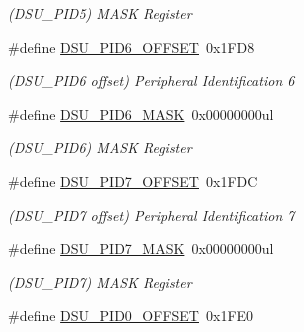 \begin{DoxyCompactItemize}
\begin{DoxyCompactList}\small\item\em (D\+S\+U\+\_\+\+P\+I\+D5) M\+A\+S\+K Register \end{DoxyCompactList}\item 
\hypertarget{group___s_a_m_l21___d_s_u_gaef7906d7c83735893dad365a6292f4c2}{}\#define \hyperlink{group___s_a_m_l21___d_s_u_gaef7906d7c83735893dad365a6292f4c2}{D\+S\+U\+\_\+\+P\+I\+D6\+\_\+\+O\+F\+F\+S\+E\+T}~0x1\+F\+D8\label{group___s_a_m_l21___d_s_u_gaef7906d7c83735893dad365a6292f4c2}

\begin{DoxyCompactList}\small\item\em (D\+S\+U\+\_\+\+P\+I\+D6 offset) Peripheral Identification 6 \end{DoxyCompactList}\item 
\hypertarget{group___s_a_m_l21___d_s_u_gac1a214954faa7cfd1597c2f5dc50b61e}{}\#define \hyperlink{group___s_a_m_l21___d_s_u_gac1a214954faa7cfd1597c2f5dc50b61e}{D\+S\+U\+\_\+\+P\+I\+D6\+\_\+\+M\+A\+S\+K}~0x00000000ul\label{group___s_a_m_l21___d_s_u_gac1a214954faa7cfd1597c2f5dc50b61e}

\begin{DoxyCompactList}\small\item\em (D\+S\+U\+\_\+\+P\+I\+D6) M\+A\+S\+K Register \end{DoxyCompactList}\item 
\hypertarget{group___s_a_m_l21___d_s_u_ga177551481d873cd49c5348a580bb583d}{}\#define \hyperlink{group___s_a_m_l21___d_s_u_ga177551481d873cd49c5348a580bb583d}{D\+S\+U\+\_\+\+P\+I\+D7\+\_\+\+O\+F\+F\+S\+E\+T}~0x1\+F\+D\+C\label{group___s_a_m_l21___d_s_u_ga177551481d873cd49c5348a580bb583d}

\begin{DoxyCompactList}\small\item\em (D\+S\+U\+\_\+\+P\+I\+D7 offset) Peripheral Identification 7 \end{DoxyCompactList}\item 
\hypertarget{group___s_a_m_l21___d_s_u_ga16cbaf00d0e9956cdbf2f3f627576ecc}{}\#define \hyperlink{group___s_a_m_l21___d_s_u_ga16cbaf00d0e9956cdbf2f3f627576ecc}{D\+S\+U\+\_\+\+P\+I\+D7\+\_\+\+M\+A\+S\+K}~0x00000000ul\label{group___s_a_m_l21___d_s_u_ga16cbaf00d0e9956cdbf2f3f627576ecc}

\begin{DoxyCompactList}\small\item\em (D\+S\+U\+\_\+\+P\+I\+D7) M\+A\+S\+K Register \end{DoxyCompactList}\item 
\hypertarget{group___s_a_m_l21___d_s_u_gaea9d171f0922c1d3459cd94571421b57}{}\#define \hyperlink{group___s_a_m_l21___d_s_u_gaea9d171f0922c1d3459cd94571421b57}{D\+S\+U\+\_\+\+P\+I\+D0\+\_\+\+O\+F\+F\+S\+E\+T}~0x1\+F\+E0\label{group___s_a_m_l21___d_s_u_gaea9d171f0922c1d3459cd94571421b57}


\end{DoxyCompactItemize}

